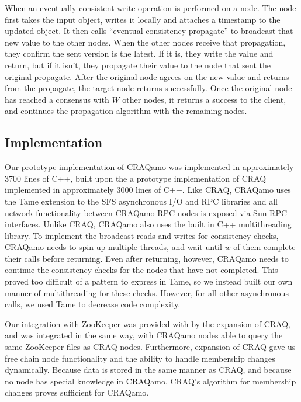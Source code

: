 When an eventually consistent write operation is performed on a node. The node first takes the input object, writes it locally and attaches a timestamp to the updated object. It then calls ``eventual consistency propagate'' to broadcast that new value to the other nodes.  When the other nodes receive that propagation, they confirm the sent version is the latest.  If it is, they write the value and return, but if it isn't, they propagate their value to the node that sent the original propagate.  After the original node agrees on the new value and returns from the propagate, the target node returns successfully. Once the original node has reached a consensus with $W$ other nodes, it returns a success to the client, and continues the propagation algorithm with the remaining nodes. 

\subsection{Implementation}
Our prototype implementation of CRAQamo was implemented in approximately 3700 lines of C++,
built upon the a prototype implementation of CRAQ implemented in approximately 3000 lines of C++.
Like CRAQ, CRAQamo uses the Tame \cite{tame} extension to the SFS asynchronous I/O and RPC libraries \cite{sfs} and all network functionality between CRAQamo RPC nodes is exposed via Sun RPC interfaces.
Unlike CRAQ, CRAQamo also uses the built in C++ multithreading library.
To implement the broadcast reads and writes for consistency checks, CRAQamo needs to spin up multiple threads, and wait until $w$ of them complete their calls before returning.
Even after returning, however, CRAQamo needs to continue the consistency checks for the nodes that have not completed.
This proved too difficult of a pattern to express in Tame, so we instead built our own manner of multithreading for these checks.
However, for all other asynchronous calls, we used Tame to decrease code complexity.

Our integration with ZooKeeper was provided with by the expansion of CRAQ, and was integrated in the same way, with CRAQamo nodes able to query the same ZooKeeper files as CRAQ nodes.
Furthermore, expansion of CRAQ gave us free chain node functionality and the ability to handle membership changes dynamically.
Because data is stored in the same manner as CRAQ, and because no node has special knowledge in CRAQamo, CRAQ's algorithm for membership changes proves sufficient for CRAQamo.
